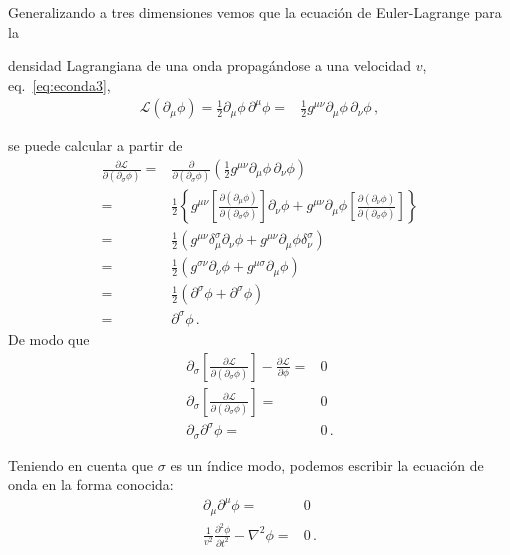 Generalizando a tres dimensiones vemos que la ecuación de Euler-Lagrange para la
\begin{frame}
densidad Lagrangiana de una onda propagándose a una velocidad $v$, eq.~\eqref{eq:econda3},
\begin{align}
  \mathcal{L}(\partial_{\mu} \phi)=  \frac{1}{2}{\partial_\mu\phi}\,{\partial^\mu\phi}
  =& \frac{1}{2}g^{\mu\nu}{\partial_\mu\phi}\,{\partial_{\nu}\phi}\,,
\end{align}
\end{frame}
se puede calcular a partir de
\begin{align}
  \frac{\partial\mathcal{L}}{\partial(\partial_{\sigma}\phi)}=&
                                                                \frac{\partial}{\partial(\partial_{\sigma}\phi)} \left( \frac{1}{2}g^{\mu\nu}{\partial_\mu\phi}\,{\partial_{\nu}\phi} \right) \nonumber\\
    =&\frac{1}{2} \left\{  g^{\mu\nu}\left[ \frac{\partial \left( \partial_{\mu}\phi \right)}{\partial \left( \partial_{\sigma}\phi \right)} \right]\partial_{\nu}\phi
     +g^{\mu\nu} \partial_{\mu}\phi \left[ \frac{\partial \left( \partial_{\nu}\phi \right)}{\partial \left( \partial_{\sigma}\phi \right)} \right] \right\} \nonumber\\
    =&\frac{1}{2}\left(  g^{\mu\nu}\delta^{\sigma}_{\mu}\partial_{\nu}\phi
     +  g^{\mu\nu}\partial_{\mu}\phi \delta ^{\sigma}_{\nu}\right) \nonumber\\
    =&\frac{1}{2}\left(  g^{\sigma\nu}\partial_{\nu}\phi
       +  g^{\mu\sigma}\partial_{\mu}\phi \right) \nonumber\\
           =&\frac{1}{2}\left(  \partial^{\sigma}\phi
     + \partial^{\sigma}\phi \right) \nonumber\\
=& \partial^{\sigma}\phi\,.
\end{align}
De modo que
\begin{align}
   \partial_{\sigma} \left[ \frac{\partial\mathcal{L}}{\partial(\partial_{\sigma}\phi)}\right]-\frac{\partial\mathcal{L}}{\partial\phi}=&0 \nonumber\\
  \partial_{\sigma} \left[ \frac{\partial\mathcal{L}}{\partial(\partial_{\sigma}\phi)}\right]=&0 \nonumber\\
       \partial_{\sigma}\partial^{\sigma}\phi=&0 \,.
\end{align}
\begin{frame}
Teniendo en cuenta que $\sigma$ es un índice modo, podemos escribir la ecuación de onda en la forma conocida:
\begin{align}
     \partial_{\mu}\partial^{\mu}\phi=&0 \nonumber\\
     \frac{1}{v^2}\frac{\partial^2\phi}{\partial t^2}-\nabla^2\phi=&0\,.
\end{align}
\end{frame}

